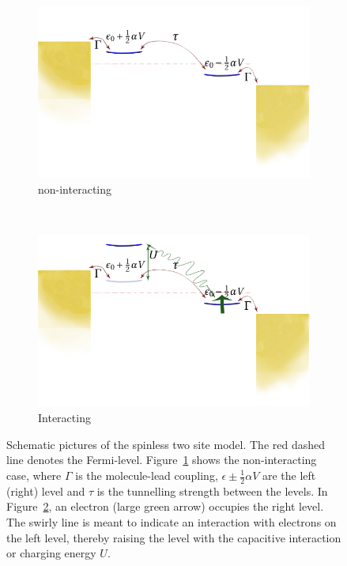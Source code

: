 \begin{figure}[!bt]
    \begin{subfigure}[b]{0.48\textwidth}
        \includegraphics[height=.20\textheight]{pdf/non_interacting_schematics.pdf}\caption{non\hyp{}interacting}\label{fig:twositea}
    \end{subfigure}
    ~
    \begin{subfigure}[b]{0.48\textwidth}
        \includegraphics[height=.20\textheight]{pdf/interacting_schematics.pdf}\caption{Interacting}\label{fig:twositeb}
    \end{subfigure}
    \caption{Schematic pictures of the spinless two site model. The red dashed line denotes the Fermi-level. Figure~\ref{fig:twositea} shows the non\hyp{}interacting case, where $\Gamma$ is the molecule-lead coupling, $\epsilon \pm \frac{1}{2} \alpha V$ are the left (right) level and $\tau$ is the tunnelling strength between the levels. In Figure~\ref{fig:twositeb}, an electron (large green arrow) occupies the right level. The swirly line is meant to indicate an interaction with electrons on the left level, thereby raising the level with the capacitive interaction or charging energy $U$.} \label{fig:twosite}
\end{figure}

